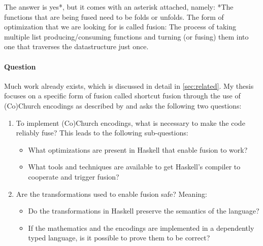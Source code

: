 The answer is yes*, but it comes with an asterisk attached, namely: *The functions that are being fused need to be folds or unfolds.
The form of optimization that we are looking for is called fusion:
The process of taking multiple list producing/consuming functions and turning (or fusing) them into one that traverses the datastructure just once.

\paragraph{Question}
Much work already exists, which is discussed in detail in \autoref{sec:related}.
My thesis focuses on a specific form of fusion called shortcut fusion through the use of (Co)Church encodings as described by \cite{Harper2011} and asks the following two questions:
\begin{enumerate}
  \item To implement (Co)Church encodings, what is necessary to make the code reliably fuse? This leads to the following sub-questions:
  \begin{itemize}
    \item What optimizations are present in Haskell that enable fusion to work?
    \item What tools and techniques are available to get Haskell's compiler to cooperate and trigger fusion?
  \end{itemize}
  \item Are the transformations used to enable fusion safe? Meaning:
  \begin{itemize}
    \item Do the transformations in Haskell preserve the semantics of the language?
    \item If the mathematics and the encodings are implemented in a dependently typed language, is it possible to prove them to be correct?
  \end{itemize}
\end{enumerate}

